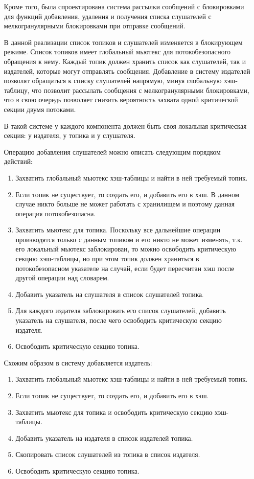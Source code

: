 Кроме того, была спроектирована система рассылки сообщений с 
блокировками для функций добавления, удаления и получения списка 
слушателей с мелкогранулярными блокировками при отправке 
сообщений.

В данной реализации список топиков и слушателей изменяется в блокирующем режиме. Список топиков имеет глобальный мьютекс для потокобезопасного обращения к нему. Каждый топик должен хранить список как слушателей, так и издателей, которые могут отправлять сообщения. Добавление в систему издателей позволят обращаться к списку слушателей напрямую, минуя глобальную хэш-таблицу, что позволит рассылать сообщения с мелкогранулярными блокировками, что в свою очередь позволяет снизить вероятность захвата одной критической секции двумя потоками.

В такой системе у каждого компонента должен быть своя локальная критическая секция: у издателя, у топика и у слушателя.

Операцию добавления слушателей можно описать следующим порядком действий:

\begin{enumerate}
	\item Захватить глобальный мьютекс хэш-таблицы и найти в ней требуемый топик.
	\item Если топик не существует, то создать его, и добавить его в хэш. В данном случае никто больше не может работать с хранилищем и поэтому данная операция потокобезопасна.
	\item Захватить мьютекс для топика. Поскольку все дальнейшие операции производятся только с данным топиком и его никто не может изменять, т.к. его локальный мьютекс заблокирован, то можно освободить критическую секцию хэш-таблицы, но при этом топик должен храниться в потокобезопасном указателе на случай, если будет пересчитан хэш после другой операции над словарем.
	\item Добавить указатель на слушателя в список слушателей топика.
	\item Для каждого издателя заблокировать его список слушателей, добавить указатель на слушателя, после чего освободить критическую секцию издателя.
	\item Освободить критическую секцию топика.
\end{enumerate}

Схожим образом в систему добавляется издатель:

\begin{enumerate}
	\item Захватить глобальный мьютекс хэш-таблицы и найти в ней требуемый топик.
	\item Если топик не существует, то создать его, и добавить его в хэш.
	\item Захватить мьютекс для топика и освободить критическую секцию хэш-таблицы.
	\item Добавить указатель на издателя в список издателей топика.
	\item Скопировать список слушателей из топика в список издателя.
	\item Освободить критическую секцию топика.
\end{enumerate}

